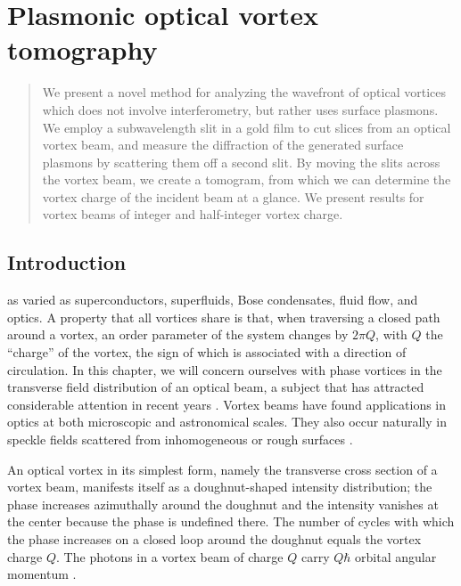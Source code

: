 \chapter{Plasmonic optical vortex tomography}
\label{ch:tomography}

\begin{abstract}
We present a novel method for analyzing the wavefront of optical vortices which does not involve interferometry, but rather uses surface plasmons. We employ a subwavelength slit in a gold film to cut slices from an optical vortex beam, and measure the diffraction of the generated surface plasmons by scattering them off a second slit. By moving the slits across the vortex beam, we create a tomogram, from which we can determine the vortex charge of the incident beam at a glance. We present results for vortex beams of integer and half-integer vortex charge.
\end{abstract}

\section{Introduction}

 as varied as superconductors, superfluids, Bose condensates, fluid flow, and optics.
A property that all vortices share is that, when traversing a closed path around a vortex, an order parameter of the system changes by $2\pi Q$, with $Q$ the ``charge'' of the vortex, the sign of which is associated with a direction of circulation.
In this chapter, we will concern ourselves with phase vortices in the transverse field distribution of an optical beam, a subject that has attracted considerable attention in recent years \cite{Soskin2001,AllenBarnett}. Vortex beams have found applications in optics at both microscopic \cite{Foo2005} and astronomical \cite{Jesacher2007} scales. They also occur naturally in speckle fields scattered from inhomogeneous or rough surfaces \cite{Baranova1981}.

An optical vortex in its simplest form, namely the transverse cross section of a vortex beam, manifests itself as a doughnut-shaped intensity distribution; the phase increases azimuthally around the doughnut and the intensity vanishes at the center because the phase is undefined there. The number of cycles with which the phase increases on a closed loop around the doughnut equals the vortex charge $Q$. The photons in a vortex beam of charge $Q$ carry $Q\hbar$ orbital angular momentum \cite{Allen1992}.

